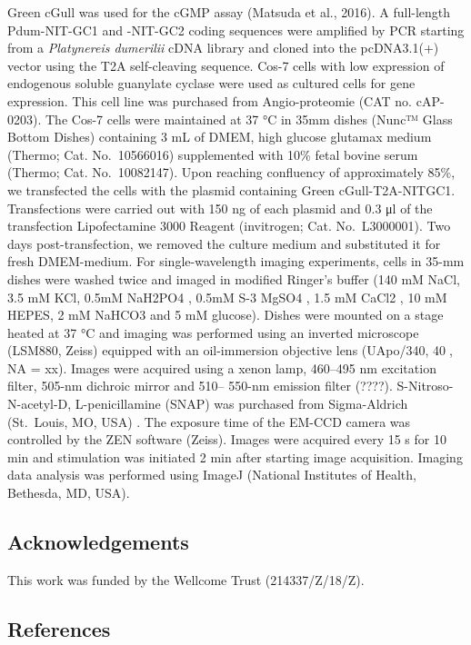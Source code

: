 \documentclass[
  10pt,
  onecolumn]{article}
\begin{document}
Green cGull was used for the cGMP assay (Matsuda et al., 2016). A
full-length Pdum-NIT-GC1 and -NIT-GC2 coding sequences were amplified by
PCR starting from a \emph{Platynereis dumerilii} cDNA library and cloned
into the pcDNA3.1(+) vector using the T2A self-cleaving sequence. Cos-7
cells with low expression of endogenous soluble guanylate cyclase were
used as cultured cells for gene expression. This cell line was purchased
from Angio-proteomie (CAT no. cAP-0203). The Cos-7 cells were maintained
at 37 °C in 35mm dishes (Nunc™ Glass Bottom Dishes) containing 3 mL of
DMEM, high glucose glutamax medium (Thermo; Cat. No.~10566016)
supplemented with 10\% fetal bovine serum (Thermo; Cat. No.~10082147).
Upon reaching confluency of approximately 85\%, we transfected the cells
with the plasmid containing Green cGull-T2A-NITGC1. Transfections were
carried out with 150 ng of each plasmid and 0.3 μl of the transfection
Lipofectamine 3000 Reagent (invitrogen; Cat. No.~L3000001). Two days
post-transfection, we removed the culture medium and substituted it for
fresh DMEM-medium. For single-wavelength imaging experiments, cells in
35-mm dishes were washed twice and imaged in modified Ringer's buffer
(140 mM NaCl, 3.5 mM KCl, 0.5mM NaH2PO4 , 0.5mM S-3 MgSO4 , 1.5 mM CaCl2
, 10 mM HEPES, 2 mM NaHCO3 and 5 mM glucose). Dishes were mounted on a
stage heated at 37 °C and imaging was performed using an inverted
microscope (LSM880, Zeiss) equipped with an oil-immersion objective lens
(UApo/340, 40, NA = xx). Images were acquired using a xenon lamp,
460--495 nm excitation filter, 505-nm dichroic mirror and 510-- 550-nm
emission filter (????). S-Nitroso-N-acetyl-D, L-penicillamine (SNAP) was
purchased from Sigma-Aldrich (St.~Louis, MO, USA) . The exposure time of
the EM-CCD camera was controlled by the ZEN software (Zeiss). Images
were acquired every 15 s for 10 min and stimulation was initiated 2 min
after starting image acquisition. Imaging data analysis was performed
using ImageJ (National Institutes of Health, Bethesda, MD, USA).

\hypertarget{acknowledgements}{%
\subsection{Acknowledgements}\label{acknowledgements}}

This work was funded by the Wellcome Trust (214337/Z/18/Z).

\hypertarget{references}{%
\subsection*{References}\label{references}}
\end{document}
